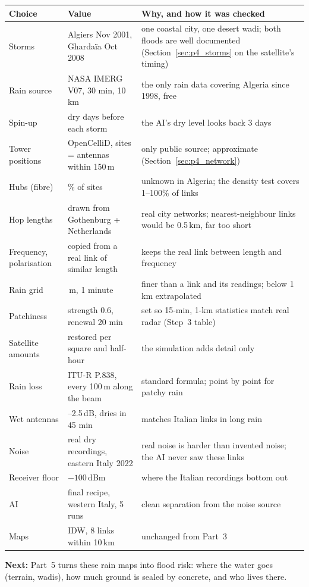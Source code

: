 \begin{center}\footnotesize\setlength{\tabcolsep}{4pt}
\begin{tabular}{>{\raggedright\arraybackslash}p{2.8cm}>{\raggedright\arraybackslash}p{3.6cm}>{\raggedright\arraybackslash}p{6.9cm}}
\toprule
Choice & Value & Why, and how it was checked\\
\midrule
Storms & Algiers Nov 2001, Ghardaïa Oct 2008 & one coastal city, one desert wadi; both floods are well documented (Section~\ref{sec:p4_storms}
on the satellite's timing)\\
Rain source & NASA IMERG V07, 30 min, 10 km & the only rain data covering Algeria since 1998, free\\
Spin-up & 3 dry days before each storm & the AI's dry level looks back 3 days\\
Tower positions & OpenCelliD, sites = antennas within 150\,m & only public source; approximate (Section~\ref{sec:p4_network})\\
Hubs (fibre) & 30\% of sites & unknown in Algeria; the density test covers 1--100\% of links\\
Hop lengths & drawn from Gothenburg + Netherlands & real city networks; nearest-neighbour links would be 0.5\,km, far too short\\
Frequency, polarisation & copied from a real link of similar length & keeps the real link between length and frequency\\
Rain grid & 500\,m, 1 minute & finer than a link and its readings; below 1\,km extrapolated\\
Patchiness & strength 0.6, renewal 20 min & set so 15-min, 1-km statistics match real radar (Step~3 table)\\
Satellite amounts & restored per square and half-hour & the simulation adds detail only\\
Rain loss & ITU-R P.838, every 100\,m along the beam & standard formula; point by point for patchy rain\\
Wet antennas & 1--2.5\,dB, dries in 45 min & matches Italian links in long rain\\
Noise & real dry recordings, eastern Italy 2022 & real noise is harder than invented noise; the AI never saw these links\\
Receiver floor & $-100$\,dBm & where the Italian recordings bottom out\\
AI & final recipe, western Italy, 5 runs & clean separation from the noise source\\
Maps & IDW, 8 links within 10\,km & unchanged from Part~3\\
\bottomrule
\end{tabular}
\end{center}

\textbf{Next:} Part~5 turns these rain maps into flood risk: where the water goes (terrain, wadis), how much ground is
sealed by concrete, and who lives there.
